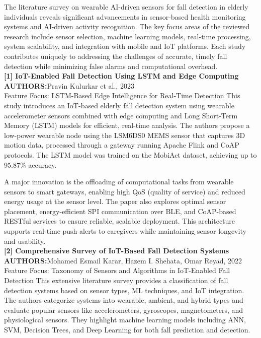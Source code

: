 \documentclass[a4paper, 12pt]{report}
\begin{document}
The literature survey on wearable AI-driven sensors for fall detection in elderly individuals reveals significant advancements in sensor-based health monitoring systems and AI-driven activity recognition. The key focus areas of the reviewed research include sensor selection, machine learning models, real-time processing, system scalability, and integration with mobile and IoT platforms. Each study contributes uniquely to addressing the challenges of accurate, timely fall detection while minimizing false alarms and computational overhead.\\
\noindent \textbf{[1] IoT-Enabled Fall Detection Using LSTM and Edge Computing}\\
\textbf{AUTHORS:}Pravin Kulurkar et al., 2023\\
Feature Focus: LSTM-Based Edge Intelligence for Real-Time Detection
This study introduces an IoT-based elderly fall detection system using wearable accelerometer sensors combined with edge computing and Long Short-Term Memory (LSTM) models for efficient, real-time analysis. The authors propose a low-power wearable node using the LSM6DS0 MEMS sensor that captures 3D motion data, processed through a gateway running Apache Flink and CoAP protocols. The LSTM model was trained on the MobiAct dataset, achieving up to 95.87\% accuracy.

A major innovation is the offloading of computational tasks from wearable sensors to smart gateways, enabling high QoS (quality of service) and reduced energy usage at the sensor level. The paper also explores optimal sensor placement, energy-efficient SPI communication over BLE, and CoAP-based RESTful services to ensure reliable, scalable deployment. This architecture supports real-time push alerts to caregivers while maintaining sensor longevity and usability.\\

\noindent\textbf{[2] Comprehensive Survey of IoT-Based Fall Detection Systems}\\
\textbf{AUTHORS:}Mohamed Esmail Karar, Hazem I. Shehata, Omar Reyad, 2022\\
Feature Focus: Taxonomy of Sensors and Algorithms in IoT-Enabled Fall Detection
This extensive literature survey provides a classification of fall detection systems based on sensor types, ML techniques, and IoT integration. The authors categorize systems into wearable, ambient, and hybrid types and evaluate popular sensors like accelerometers, gyroscopes, magnetometers, and physiological sensors. They highlight machine learning models including ANN, SVM, Decision Trees, and Deep Learning for both fall prediction and detection.
\end{document}
